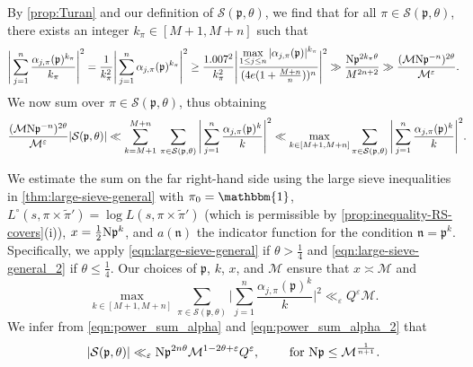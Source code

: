 \documentclass[11pt]{amsart}
\theoremstyle{remark}
\numberwithin{equation}{section}
\newcommand{\kp}{\mathfrak{p}}
\newcommand{\kn}{\mathfrak{n}}
\newcommand{\N}{\textnormal{N}}
\renewcommand{\tilde}{\widetilde}
\renewcommand{\epsilon}{\varepsilon}
\begin{document}
By \cref{prop:Turan} and our definition of $\mathcal{S}(\kp,\theta)$, we find that for all $\pi\in\mathcal{S}(\kp,\theta)$, there exists an integer $k_{\pi}\in[M+1,M+n]$ such that
\[
\Bigg|\sum_{j=1}^n \frac{\alpha_{j,\pi}(\kp)^{k_{\pi}}}{k_{\pi}}\Bigg|^2=\frac{1}{k_{\pi}^2}\Bigg|\sum_{j=1}^n \alpha_{j,\pi}(\kp)^{k_{\pi}}\Bigg|^2\geq \frac{1.007^2}{k_{\pi}^2}\Bigg|\frac{\displaystyle\max_{1\leq j\leq n}|\alpha_{j,\pi}(\kp)|^{k_{\pi}}}{(4e(1+\frac{M+n}{n}))^n}\Bigg|^2\gg \frac{\N\kp^{2k_{\pi} \theta}}{M^{2n+2}}\gg\frac{(\mathcal{M}\N\kp^{-n})^{2\theta}}{\mathcal{M}^{\epsilon}}.
\]
We now sum over $\pi\in\mathcal{S}(\kp,\theta)$, thus obtaining
\begin{equation}
\label{eqn:power_sum_alpha}
\frac{(\mathcal{M}\N\kp^{-n})^{2\theta}}{\mathcal{M}^{\epsilon}}|\mathcal{S}(\kp,\theta)|\ll\sum_{k=M+1}^{M+n}\,\sum_{\pi\in\mathcal{S}(\kp,\theta)}\Bigg|\sum_{j=1}^n \frac{\alpha_{j,\pi}(\kp)^{k}}{k}\Bigg|^2\ll \max_{k\in[M+1,M+n]}\sum_{\pi\in\mathcal{S}(\kp,\theta)}\Bigg|\sum_{j=1}^n \frac{\alpha_{j,\pi}(\kp)^{k}}{k}\Bigg|^2.
\hspace{-2.3mm}
\end{equation}

We estimate the sum on the far right-hand side using the large sieve inequalities in \cref{thm:large-sieve-general} with $\pi_0=\mathbbm{1}$, $L^\circ(s, \pi \times \tilde\pi') = \log L(s, \pi \times \tilde\pi')$ (which is permissible by \cref{prop:inequality-RS-covers}(i)), $x=\frac{1}{2}\N\kp^k$, and $a(\kn)$ the indicator function for the condition $\kn=\kp^k$.  Specifically, we apply \eqref{eqn:large-sieve-general} if $\theta>\frac{1}{4}$ and \eqref{eqn:large-sieve-general_2} if $\theta\leq \frac{1}{4}$.  Our choices of $\kp$, $k$, $x$, and $\mathcal{M}$ ensure that $x\asymp \mathcal{M}$ and
\begin{equation}
\label{eqn:power_sum_alpha_2}
\max_{k\in[M+1,M+n]}\sum_{\pi\in\mathcal{S}(\kp,\theta)}\Bigg|\sum_{j=1}^n \frac{\alpha_{j,\pi}(\kp)^{k}}{k}\Bigg|^2\ll_{\epsilon}Q^{\epsilon}\mathcal{M}.
\end{equation}
We infer from \eqref{eqn:power_sum_alpha} and \eqref{eqn:power_sum_alpha_2} that
\begin{equation}
\label{eqn:nice_S_bound_pre}
|\mathcal{S}(\kp,\theta)|\ll_{\epsilon}\N\kp^{2n\theta}\mathcal{M}^{1-2\theta+\epsilon}Q^{\epsilon},\qquad \text{ for } \N\kp\leq \mathcal{M}^{\frac{1}{n+1}}.
\end{equation}
\end{document}
